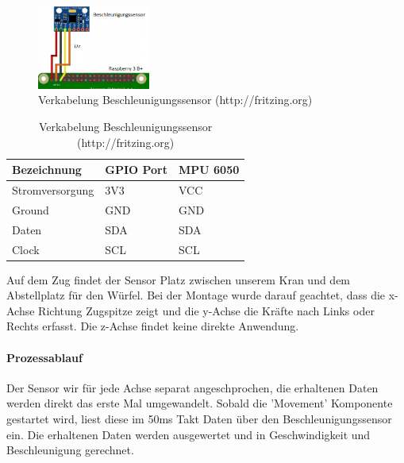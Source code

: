 \documentclass[../../main.tex]{subfiles}
\begin{document}
\begin{table}[H]
  \begin{figure}[H] \centering
    \includegraphics[width=0.33\textwidth]{Verkabelung_BeschlSensor}
    \caption{Verkabelung Beschleunigungssensor (http://fritzing.org)}
    \label{fig:Beschleunigungssensor}
  \end{figure}
  \begin{center}
  \begin{tabular}{lll}
  Bezeichnung     & GPIO Port & MPU 6050 \\ \hline
  Stromversorgung & 3V3      & VCC      \\ \hline
  Ground          & GND      & GND      \\ \hline
  Daten          & SDA      & SDA       \\ \hline
  Clock          & SCL      & SCL       \\ \hline
  \end{tabular}
  \end{center}
\end{table}

Auf dem Zug findet der Sensor Platz zwischen unserem Kran und dem Abstellplatz für den Würfel. Bei der Montage wurde darauf geachtet, dass die x-Achse Richtung Zugspitze zeigt und die y-Achse die Kräfte nach Links oder Rechts erfasst. Die z-Achse findet keine direkte Anwendung.

\paragraph{Prozessablauf}
Der Sensor wir für jede Achse separat angeschprochen, die erhaltenen Daten werden direkt das erste Mal umgewandelt. Sobald die 'Movement' Komponente gestartet wird, liest diese im 50ms Takt Daten über den Beschleunigungssensor ein. Die erhaltenen Daten werden ausgewertet und in Geschwindigkeit und Beschleunigung gerechnet.
\end{document}
